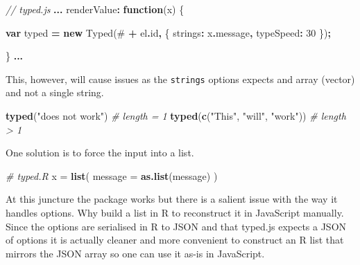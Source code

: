 \documentclass[
]{krantz}
\makeatletter
\newenvironment{Shaded}{\begin{snugshade}}{\end{snugshade}}
\newcommand{\AttributeTok}[1]{\textcolor[rgb]{0.61,0.61,0.61}{#1}}
\newcommand{\CommentTok}[1]{\textcolor[rgb]{0.37,0.37,0.37}{\textit{#1}}}
\newcommand{\DataTypeTok}[1]{\textcolor[rgb]{0.27,0.27,0.27}{#1}}
\newcommand{\DecValTok}[1]{\textcolor[rgb]{0.06,0.06,0.06}{#1}}
\newcommand{\KeywordTok}[1]{\textcolor[rgb]{0.27,0.27,0.27}{\textbf{#1}}}
\newcommand{\NormalTok}[1]{#1}
\newcommand{\OperatorTok}[1]{\textcolor[rgb]{0.43,0.43,0.43}{\textbf{#1}}}
\newcommand{\StringTok}[1]{\textcolor[rgb]{0.5,0.5,0.5}{#1}}
\newenvironment{kframe}{%
\medskip{}
\setlength{\fboxsep}{.8em}
 \def\at@end@of@kframe{}%
 \ifinner\ifhmode%
  \def\at@end@of@kframe{\end{minipage}}%
  \begin{minipage}{\columnwidth}%
 \fi\fi%
 \def\FrameCommand##1{\hskip\@totalleftmargin \hskip-\fboxsep
 \colorbox{shadecolor}{##1}\hskip-\fboxsep
     \hskip-\linewidth \hskip-\@totalleftmargin \hskip\columnwidth}%
 \MakeFramed {\advance\hsize-\width
   \@totalleftmargin\z@ \linewidth\hsize
   \@setminipage}}%
 {\par\unskip\endMakeFramed%
 \at@end@of@kframe}
\renewenvironment{Shaded}{\begin{kframe}}{\end{kframe}}
\makeatother
\begin{document}
\begin{Shaded}
\begin{Highlighting}[]
\CommentTok{// typed.js}
\OperatorTok{...}
\NormalTok{renderValue}\OperatorTok{:} \KeywordTok{function}\NormalTok{(x) \{}

  \KeywordTok{var}\NormalTok{ typed }\OperatorTok{=} \KeywordTok{new}\NormalTok{ Typed(}\StringTok{\textquotesingle{}\#\textquotesingle{}} \OperatorTok{+}\NormalTok{ el}\OperatorTok{.}\AttributeTok{id}\OperatorTok{,}\NormalTok{ \{}
    \DataTypeTok{strings}\OperatorTok{:}\NormalTok{ x}\OperatorTok{.}\AttributeTok{message}\OperatorTok{,}
    \DataTypeTok{typeSpeed}\OperatorTok{:} \DecValTok{30}
\NormalTok{  \})}\OperatorTok{;}

\NormalTok{\}}
\OperatorTok{...}
\end{Highlighting}
\end{Shaded}

This, however, will cause issues as the \texttt{strings} options expects and array (vector) and not a single string.

\begin{Shaded}
\begin{Highlighting}[]
\KeywordTok{typed}\NormalTok{(}\StringTok{"does not work"}\NormalTok{) }\CommentTok{\# length =  1}
\KeywordTok{typed}\NormalTok{(}\KeywordTok{c}\NormalTok{(}\StringTok{"This"}\NormalTok{, }\StringTok{"will"}\NormalTok{, }\StringTok{"work"}\NormalTok{)) }\CommentTok{\# length \textgreater{} 1}
\end{Highlighting}
\end{Shaded}

One solution is to force the input into a list.

\begin{Shaded}
\begin{Highlighting}[]
\CommentTok{\# typed.R}
\NormalTok{x =}\StringTok{ }\KeywordTok{list}\NormalTok{(}
  \DataTypeTok{message =} \KeywordTok{as.list}\NormalTok{(message)}
\NormalTok{)}
\end{Highlighting}
\end{Shaded}

At this juncture the package works but there is a salient issue with the way it handles options. Why build a list in R to reconstruct it in JavaScript manually. Since the options are serialised in R to JSON and that typed.js expects a JSON of options it is actually cleaner and more convenient to construct an R list that mirrors the JSON array so one can use it as-is in JavaScript.
\end{document}
